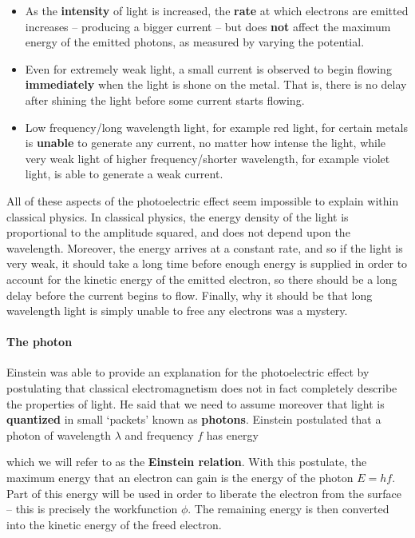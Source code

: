 \documentclass{article}
\begin{document}
\begin{itemize}
\item As the \textbf{intensity} of light is increased, the \textbf{rate} at which electrons are emitted increases -- producing a bigger current -- but does \textbf{not} affect the maximum energy of the emitted photons, as measured by varying the potential.
\item Even for extremely weak light, a small current is observed to begin flowing \textbf{immediately} when the light is shone on the metal. That is, there is no delay after shining the light before some current starts flowing.
\item Low frequency/long wavelength light, for example red light, for certain metals is \textbf{unable} to generate any current, no matter how intense the light, while very weak light of higher frequency/shorter wavelength, for example violet light, is able to generate a weak current.
\end{itemize}

All of these aspects of the photoelectric effect seem impossible to explain within classical physics. In classical physics, the energy density of the light is proportional to the amplitude squared, and does not depend upon the wavelength. Moreover, the energy arrives at a constant rate, and so if the light is very weak, it should take a long time before enough energy is supplied in order to account for the kinetic energy of the emitted electron, so there should be a long delay before the current begins to flow. Finally, why it should be that long wavelength light is simply unable to free any electrons was a mystery.

\paragraph{The photon}\label{The photon}

Einstein was able to provide an explanation for the photoelectric effect by postulating that classical electromagnetism does not in fact completely describe the properties of light. He said that we need to assume moreover that light is \textbf{quantized} in small `packets' known as \textbf{photons}. Einstein postulated that a photon of wavelength $\lambda$ and frequency $f$ has energy

which we will refer to as the \textbf{Einstein relation}. With this postulate, the maximum energy that an electron can gain is the energy of the photon $E = h f$. Part of this energy will be used in order to liberate the electron from the surface -- this is precisely the workfunction $\phi$. The remaining energy is then converted into the kinetic energy of the freed electron.
\end{document}
